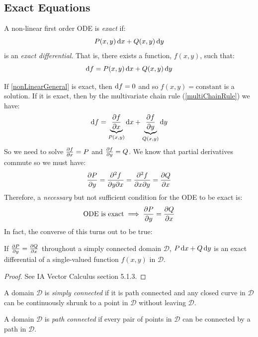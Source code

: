 \documentclass[../main.tex]{subfiles}
\begin{document}
\subsection{Exact Equations}
\begin{definition}[Exact]
  A non-linear first order ODE is \textit{exact} if:
  \[
    P(x, y)\d{x} + Q(x, y)\d{y}
  \]
  is an \textit{exact differential}.
  That is, there exists a function, $f(x, y)$, such that:
  \[
    \d{f} = P(x, y)\d{x} + Q(x, y)\d{y}
  \]
\end{definition}
If \cref{nonLinearGeneral} is exact, then $\d{f} = 0$ and so $f(x, y) = \text{constant}$ is a solution.
If it is exact, then by the multivariate chain rule (\cref{multiChainRule}) we have:
\[
  \d{f} = \underbrace{\pderiv{f}{x}}_{P(x, y)} \d{x} + \underbrace{\pderiv{f}{y}}_{Q(x, y)} \d{y}
\]
So we need to solve $\pderiv{f}{x} = P$ and $\pderiv{f}{y} = Q$.
We know that partial derivatives commute so we must have:
\[
  \pderiv{P}{y} = \frac{\partial^2 f}{\partial y \partial x} = \frac{\partial^2 f}{\partial x \partial y} = \pderiv{Q}{x}
\]
Therefore, a \textit{necessary} but not sufficient condition for the ODE to be exact is:
\[
  \text{ODE is exact} \implies \pderiv{P}{y} = \pderiv{Q}{x}
\]
In fact, the converse of this turns out to be true:
\begin{theorem}
  If $\pderiv{P}{y} = \pderiv{Q}{x}$ throughout a simply connected domain $\mathcal{D}$, $P\d{x} + Q\d{y}$ is an exact differential of a single-valued function $f(x, y)$ in $\mathcal{D}$.
\end{theorem}
\begin{proof}
  See IA Vector Calculus section 5.1.3.
\end{proof}
\begin{definition}
  A domain $\mathcal{D}$ is \textit{simply connected} if it is path connected and any closed curve in $\mathcal{D}$ can be continuously shrunk to a point in $\mathcal{D}$ without leaving $\mathcal{D}$.
\end{definition}
\begin{definition}
  A domain $\mathcal{D}$  is \textit{path connected} if every pair of points in $\mathcal{D}$ can be connected by a path in $\mathcal{D}$.
\end{definition}
\end{document}
